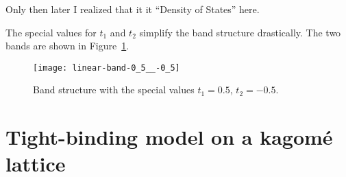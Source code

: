 \documentclass[11pt, english, fleqn, DIV=15, headinclude, BCOR=1cm]{scrartcl}
\begin{document}
Only then later I realized that it it “Density of States” here.

The special values for $t_1$ and $t_2$ simplify the band structure drastically.
The two bands are shown in Figure~\ref{fig:band-3}.

\begin{figure}
    \centering
    \texttt{[image: linear-band-0\_5\_\_-0\_5]}
    \caption{%
        Band structure with the special values $t_1 = \num{0.5}$, $t_2 =
        \num{-0.5}$.
    }
    \label{fig:band-3}
\end{figure}

\section{Tight-binding model on a kagomé lattice}
\label{homework:2}
\end{document}
